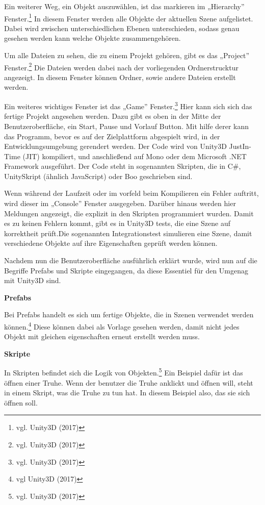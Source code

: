 Ein weiterer Weg, ein Objekt auszuwählen, ist das markieren im „Hierarchy” Fenster.\footnote{vgl. Unity3D \cite{unity4} (2017)} 
In diesem Fenster werden alle Objekte der aktuellen Szene aufgelistet. Dabei wird zwischen unterschiedlichen Ebenen unterschieden, sodass genau gesehen werden kann welche Objekte zusammengehören. 

Um alle Dateien zu sehen, die zu einem Projekt gehören, gibt es das „Project” Fenster.\footnote{vgl. Unity3D \cite{unity5} (2017)} Die Dateien werden dabei nach der vorliegenden Ordnerstrucktur angezeigt. In diesem Fenster können Ordner, sowie andere Dateien erstellt werden.

Ein weiteres wichtiges Fenster ist das „Game” Fenster.\footnote{vgl. Unity3D \cite{unity6} (2017)} Hier kann sich sich das fertige Projekt angesehen werden. Dazu gibt es oben in der Mitte der Benutzeroberfläche, ein Start, Pause und Vorlauf Button. Mit hilfe derer kann das Programm, bevor es auf der Zielplattform abgespielt wird, in der Entwicklungsumgebung gerendert werden. Der Code wird von Unity3D JustIn-Time (JIT) kompiliert, und anschließend auf Mono oder dem Microsoft .NET Framework ausgeführt. Der Code steht in sogenannten Skripten, die in C\#, UnitySkript (ähnlich JavaScript) oder Boo geschrieben sind.

Wenn während der Laufzeit oder im vorfeld beim Kompilieren ein Fehler auftritt, wird dieser im „Console” Fenster ausgegeben. Darüber hinaus werden hier Meldungen angezeigt, die explizit in den Skripten programmiert wurden.
Damit es zu keinen Fehlern kommt, gibt es in Unity3D tests, die eine Szene auf korrektheit prüft.Die sogenannten Integrationstest simulieren eine Szene, damit verschiedene Objekte auf ihre Eigenschaften geprüft werden können. 

Nachdem nun die Benutzeroberfläche ausführlich erklärt wurde, wird nun auf die Begriffe Prefabs und Skripte eingegangen, da diese Essentiel für den Umgenag mit Unity3D sind.

\textbf{Prefabs}

Bei Prefabs handelt es sich um fertige Objekte, die in Szenen verwendet werden können.\footnote{vgl Unity3D \cite{unity7} (2017)} Diese können dabei als Vorlage gesehen werden, damit nicht jedes Objekt mit gleichen eigenschaften erneut erstellt werden muss. 

\textbf{Skripte}

In Skripten befindet sich die Logik von Objekten.\footnote{vgl. Unity3D \cite{unity8} (2017)} Ein Beispiel dafür ist das öffnen einer Truhe. Wenn der benutzer die Truhe anklickt und öffnen will, steht in einem Skript, was die Truhe zu tun hat. In diesem Beispiel also, das sie sich öffnen soll. 

